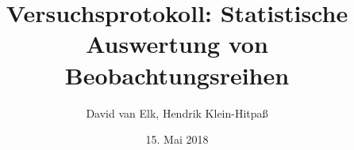 \documentclass[ngerman,
    paper=a4,
    ]{article}
\title{Versuchsprotokoll: Statistische Auswertung von Beobachtungsreihen}
\author{David van Elk, Hendrik Klein-Hitpaß}
\date{15. Mai 2018}
\begin{document}
    \maketitle
    \pagebreak
    \tableofcontents
    \pagebreak

    
    
    
    
    
    
    
\end{document}
